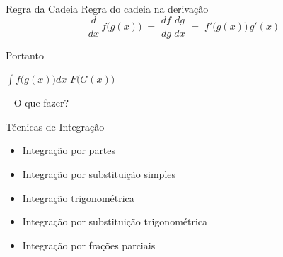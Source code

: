 \begin{frame}{Regra da Cadeia}
  Regra do cadeia na derivação
  \[
    \frac{d}{dx} \, f\big(g(x)\big)
    \;=\; \frac{df}{dg}\, \frac{dg}{dx}
    \;=\; f'\big(g(x)\big)\,g'(x)
  \]

  \pause
  Portanto

  \vspace{5mm}
  \hspace{7mm}
  \(
  \int f\big(g(x)\big)dx
  \)
  \;{\Large\color{red}$\neq$}\;
  \(
    F\big(G(x)\big)
  \)
\end{frame}

\begin{frame}{~}
  \centering
  \Large
  O que fazer?
\end{frame}

\begin{frame}{Técnicas de Integração}
\begin{itemize}[<+->]
  \setlength\itemsep{1em}
  \item Integração por partes
  \item Integração por substituição simples
  \item Integração trigonométrica
  \item Integração por substituição trigonométrica
  \item Integração por frações parciais
\end{itemize}
\end{frame}

\begin{frame}
  \tableofcontents
\end{frame}


